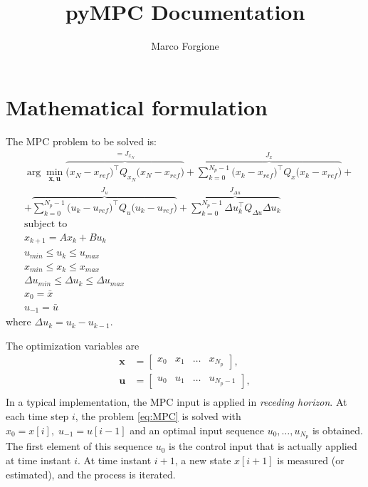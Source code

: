 \documentclass[a4paper,12pt,fleqn]{book}
\newcommand{\QxN}{Q_{x_N}}
\newcommand{\Qx}{Q_{x}}
\newcommand{\Qu}{Q_{u}}
\newcommand{\Qdu}{Q_{\Delta u}}
\newcommand{\Np}{{N_p}}
\newcommand{\varx}{\mathbf{x}}
\newcommand{\varu}{\mathbf{u}}
\begin{document}
 \title{pyMPC Documentation}
\author{Marco Forgione}

\maketitle

\chapter{Mathematical formulation}
The MPC problem to be solved is:
\begin{subequations}
\label{eq:MPC}
\begin{align}
  &\arg \min_{\varx,\varu} 
  \overbrace{\big(x_N - x_{ref}\big)^\top \QxN \big(x_N - x_{ref}\big)}^{=J_{x_N}} + 
  \overbrace{\sum_{k=0}^{\Np-1} \big(x_k - x_{ref}\big)^\top \Qx\big(x_k - x_{ref}\big)}^{J_{x}}+ \nonumber \\
  &  + 
    \overbrace{\sum_{k=0}^{\Np-1} \big(u_k - u_{ref}\big)^\top \Qu \big(u_k - u_{ref}\big)}^{J_u}
    +  
  \overbrace{\sum_{k=0}^{\Np-1} \Delta u_k^\top \Qdu \Delta u_k}^{J_{\Delta u}} \\ \nonumber
  &\text{subject to} \nonumber\\
  &x_{k+1} = Ax_k + B u_k \label{eq:linear_dynamics} \\ 
  &u_{min} \leq u_k \leq u_{max}\\
  &x_{min} \leq x_k \leq x_{max}\\
  &\Delta u_{min} \leq \Delta u_k \leq \Delta u_{max}\\
  &x_0 = \bar x\\
  &u_{-1} = \bar u
\end{align}
\end{subequations} where $\Delta u_k = u_k - u_{k-1}$.

The optimization variables are 
\begin{align}
  \varx & = \begin{bmatrix}x_0 & x_1 & \dots & x_\Np\end{bmatrix},\\
  \varu & = \begin{bmatrix}u_0 & u_1 & \dots & u_{\Np-1}\end{bmatrix},\\  
\end{align}
In a typical implementation, the MPC input is applied in \emph{receding horizon}. At each time step $i$, the problem \eqref{eq:MPC} is solved with $x_0=x[i],\;u_{-1}=u[{i-1}]$ and an optimal input sequence $u_{0},\dots,u_{\Np}$ is obtained. The first element of this sequence $u_0$ is the control input that is actually applied at time instant $i$. At time instant $i+1$, a new state $x[i+1]$ is measured (or estimated), and the process is iterated. 
\end{document}
